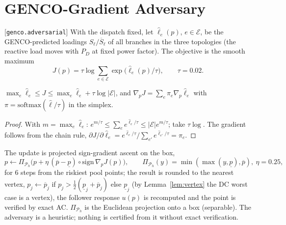 \section{GENCO-Gradient Adversary}
\label{app:adv}
[\texttt{genco.adversarial}] With the dispatch fixed, let $\hat\ell_e(p)$, $e\in\mathcal E$, be the
GENCO-predicted loadings $S_\ell/\overline S_\ell$ of all branches in the three topologies
(the reactive load moves with $P_D$ at fixed power factor). The objective is the smooth
maximum
\begin{equation}
J(p)=\tau\log\sum_{e\in\mathcal E}\exp\big(\hat\ell_e(p)/\tau\big),\qquad\tau=0.02 .
\label{eq:J}
\end{equation}
\begin{lemma}\label{lem:lse}
$\max_e\hat\ell_e\le J\le\max_e\hat\ell_e+\tau\log|\mathcal E|$, and
$\nabla_pJ=\sum_e\pi_e\nabla_p\hat\ell_e$ with $\pi=\mathrm{softmax}(\hat\ell/\tau)$ in the simplex.
\end{lemma}
\begin{proof}
With $m=\max_e\hat\ell_e$: $e^{m/\tau}\le\sum_e e^{\hat\ell_e/\tau}\le|\mathcal E|e^{m/\tau}$; take
$\tau\log$. The gradient follows from the chain rule,
$\partial J/\partial\hat\ell_e=e^{\hat\ell_e/\tau}/\sum_{e'}e^{\hat\ell_{e'}/\tau}=\pi_e$.
\end{proof}
The update is projected sign-gradient ascent on the box,
\begin{equation}
p\leftarrow\Pi_{\mathcal P_h}\big(p+\eta\,(\overline p-\underline p)\circ\mathrm{sign}\,\nabla_pJ(p)\big),\qquad
\Pi_{\mathcal P_h}(y)=\min(\max(y,\underline p),\overline p),\ \eta=0.25,
\label{eq:adv}
\end{equation}
for 6 steps from the riskiest pool points; the result is rounded to the nearest vertex,
$p_j\leftarrow\overline p_j$ if $p_j>\tfrac12(\underline p_j+\overline p_j)$ else $\underline p_j$ (by
Lemma~\ref{lem:vertex} the DC worst case is a vertex), the follower response $u(p)$ is
recomputed and the point is verified by exact AC. $\Pi_{\mathcal P_h}$ is the Euclidean
projection onto a box (separable). The adversary is a heuristic; nothing is certified from
it without exact verification.

